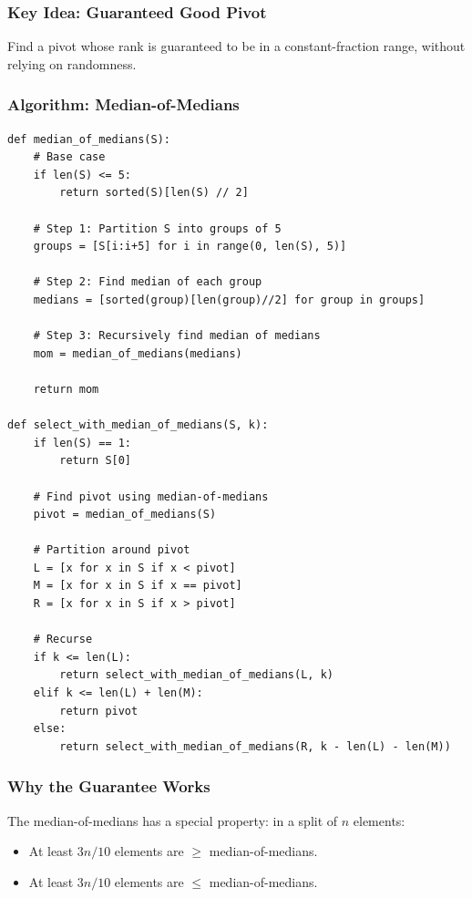 \documentclass[11pt]{article}
\begin{document}
{{\subsubsection*{Key Idea: Guaranteed Good Pivot}
Find a pivot whose rank is guaranteed to be in a constant-fraction range, without relying on randomness.

\subsubsection*{Algorithm: Median-of-Medians}
\begin{lstlisting}
def median_of_medians(S):
    # Base case
    if len(S) <= 5:
        return sorted(S)[len(S) // 2]
    
    # Step 1: Partition S into groups of 5
    groups = [S[i:i+5] for i in range(0, len(S), 5)]
    
    # Step 2: Find median of each group
    medians = [sorted(group)[len(group)//2] for group in groups]
    
    # Step 3: Recursively find median of medians
    mom = median_of_medians(medians)
    
    return mom

def select_with_median_of_medians(S, k):
    if len(S) == 1:
        return S[0]
    
    # Find pivot using median-of-medians
    pivot = median_of_medians(S)
    
    # Partition around pivot
    L = [x for x in S if x < pivot]
    M = [x for x in S if x == pivot]
    R = [x for x in S if x > pivot]
    
    # Recurse
    if k <= len(L):
        return select_with_median_of_medians(L, k)
    elif k <= len(L) + len(M):
        return pivot
    else:
        return select_with_median_of_medians(R, k - len(L) - len(M))
\end{lstlisting}

\subsubsection*{Why the Guarantee Works}

The median-of-medians has a special property: in a split of $n$ elements:
\begin{itemize}
\item At least $3n/10$ elements are $\ge$ median-of-medians.
\item At least $3n/10$ elements are $\le$ median-of-medians.
\end{itemize}

}}
\end{document}
